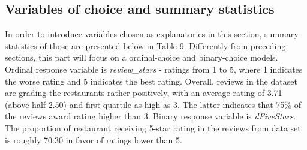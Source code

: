 \documentclass{article}
\begin{document}
\subsection{Variables of choice and summary statistics}

In order to introduce variables chosen as explanatories in this section, summary statistics of those are presented below in \hyperref[tab:ordinalsummary]{Table 9}. Differently from preceding sections, this part will focus on a ordinal-choice and binary-choice models. Ordinal response variable is \textit{review\_stars} - ratings from 1 to 5, where 1 indicates the worse rating and 5 indicates the best rating. Overall, reviews in the dataset are grading the restaurants rather positively, with an average rating of 3.71 (above half 2.50) and first quartile as high as 3. The latter indicates that 75\% of the reviews award rating higher than 3. Binary response variable is \textit{dFiveStars}. The proportion of restaurant receiving 5-star rating in the reviews from data set is roughly 70:30 in favor of ratings lower than 5. 
\end{document}
